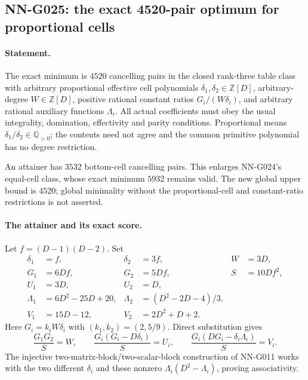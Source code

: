\subsection{NN-G025: the exact 4520-pair optimum for proportional cells}
\paragraph{Statement.}
The exact minimum is $4520$ cancelling pairs in the closed
rank-three table class with arbitrary proportional effective
cell polynomials $\delta_1,\delta_2\in\mathbb Z[D]$,
arbitrary-degree $W\in\mathbb Z[D]$, positive rational
constant ratios $G_i/(W\delta_i)$, and arbitrary rational
auxiliary functions $\Lambda_i$. All actual coefficients
must obey the usual integrality, domination, effectivity
and parity conditions. Proportional means
$\delta_1/\delta_2\in\mathbb Q_{>0}$; the contents need
not agree and the common primitive polynomial has no
degree restriction.

An attainer has $3532$ bottom-cell cancelling pairs.
This enlarges NN-G024's equal-cell class, whose exact
minimum $5932$ remains valid. The new global upper
bound is $4520$; global minimality without the
proportional-cell and constant-ratio restrictions is
not asserted.

\paragraph{The attainer and its exact score.}
Let $f=(D-1)(D-2)$. Set
\[
 \begin{aligned}
 \delta_1&=f,&\delta_2&=3f,&W&=3D,\\
 G_1&=6Df,&G_2&=5Df,&S&=10Df^2,\\
 U_1&=3D,&U_2&=D,\\
 \Lambda_1&=6D^2-25D+20,&
 \Lambda_2&=(D^2-2D-4)/3,\\
 V_1&=15D-12,&V_2&=2D^2+D+2.
 \end{aligned}                                                     \tag{G025.1}
\]
Here $G_i=k_iW\delta_i$ with $(k_1,k_2)=(2,5/9)$.
Direct substitution gives
\[
 \frac{G_1G_2}{S}=W,\qquad
 \frac{G_i(G_i-D\delta_i)}{S}=U_i,\qquad
 \frac{G_i(DG_i-\delta_i\Lambda_i)}{S}=V_i.
\]
The injective two-matrix-block/two-scalar-block construction
of NN-G011 works with the two different $\delta_i$ and
these nonzero $\Lambda_i(D^2-\Lambda_i)$, proving
associativity.

